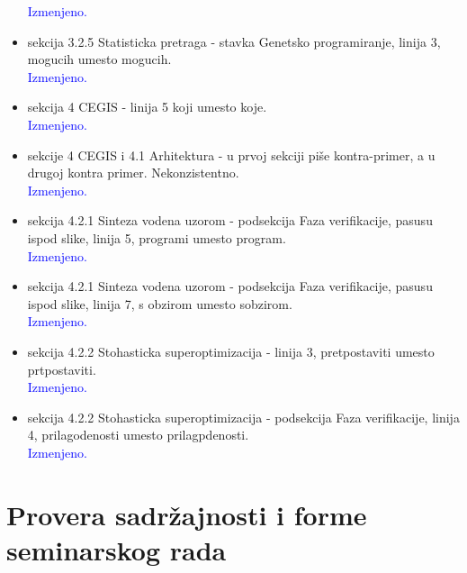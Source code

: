 \documentclass[a4paper]{report}
\newcommand{\odgovor}[1]{\textcolor{blue}{#1}}
\begin{document}
\begin{itemize}
	\odgovor{Izmenjeno.}
    \item sekcija 3.2.5 Statisticka pretraga - stavka Genetsko programiranje, linija 3, mogucih umesto mogucih.\\
	\odgovor{Izmenjeno.}
    \item sekcija 4 CEGIS - linija 5 koji umesto koje.\\
	\odgovor{Izmenjeno.}
    \item sekcije 4 CEGIS i 4.1 Arhitektura - u prvoj sekciji piše kontra-primer, a u drugoj kontra primer. Nekonzistentno.\\
	\odgovor{Izmenjeno.}
    \item sekcija 4.2.1 Sinteza vodena uzorom - podsekcija Faza verifikacije, pasusu ispod slike, linija 5, programi umesto program.\\
	\odgovor{Izmenjeno.}
    \item sekcija 4.2.1 Sinteza vodena uzorom - podsekcija Faza verifikacije, pasusu ispod slike, linija 7, s obzirom umesto sobzirom.\\
	\odgovor{Izmenjeno.}
    \item sekcija 4.2.2 Stohasticka superoptimizacija - linija 3, pretpostaviti umesto prtpostaviti.\\
	\odgovor{Izmenjeno.}
    \item sekcija 4.2.2 Stohasticka superoptimizacija - podsekcija Faza verifikacije, linija 4, prilagodenosti umesto prilagpdenosti.\\
	\odgovor{Izmenjeno.}
\end{itemize}

\section{Provera sadržajnosti i forme seminarskog rada}
\end{document}
